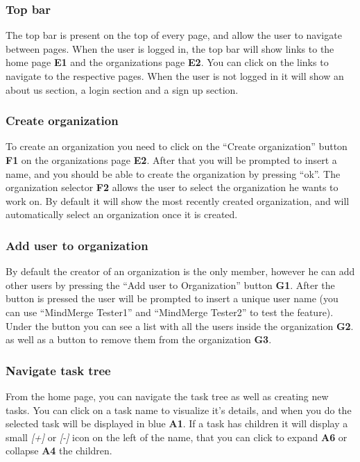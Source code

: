 \documentclass{article}
\begin{document}
\subsubsection{Top bar}

The top bar is present on the top of every page, and allow the user to navigate between pages.
\newline
When the user is logged in, the top bar will show links to the home page \textbf{E1} and the organizations page \textbf{E2}.
You can click on the links to navigate to the respective pages.
\newline
When the user is not logged in it will show an about us section, a login section and a sign up section.

\subsubsection{Create organization}

To create an organization you need to click on the ``Create organization'' button \textbf{F1} on the organizations page \textbf{E2}.
After that you will be prompted to insert a name, and you should be able to create the organization by pressing ``ok''.
\newline
The organization selector \textbf{F2} allows the user to select the organization he wants to work on. By default
it will show the most recently created organization, and will automatically select an organization once it is created.

\subsubsection{Add user to organization}

By default the creator of an organization is the only member,
however he can add other users by pressing the ``Add user to Organization'' button \textbf{G1}.
After the button is pressed the user will be prompted to insert a unique user name (you can use ``MindMerge Tester1'' and ``MindMerge Tester2'' to test the feature).
\newline
Under the button you can see a list with all the users inside the organization \textbf{G2}.
as well as a button to remove them from the organization \textbf{G3}.
\subsubsection{Navigate task tree}
From the home page, you can navigate the task tree as well as creating new tasks.
\newline
You can click on a task name to visualize it's details, and when you do the selected task will be displayed in blue \textbf{A1}.
If a task has children it will display a small \textit{[+]} or \textit{[-]}
icon on the left of the name, that you can click to expand \textbf{A6} or collapse \textbf{A4} the children.
\end{document}
